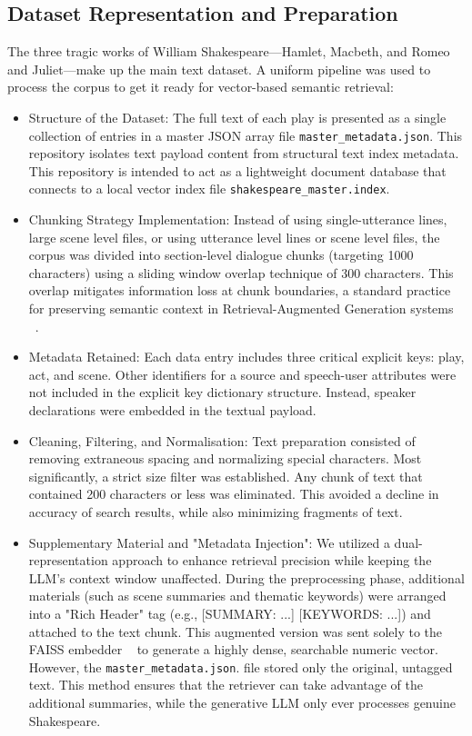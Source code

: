 \documentclass[10pt,conference]{IEEEtran}
\begin{document}
\subsection{Dataset Representation and Preparation }

The three tragic works of William Shakespeare—Hamlet, Macbeth, and Romeo and Juliet—make up the main text dataset. A uniform pipeline was used to process the corpus to get it ready for vector-based semantic retrieval: 

 
\begin{itemize}
    \item Structure of the Dataset: The full text of each play is presented as a 
    single collection of entries in a master JSON array file \verb|master_metadata.json|.
    This repository isolates text payload content from structural text index 
    metadata. This repository is intended to act as a lightweight document database that connects to a local vector index file 
    \verb|shakespeare_master.index|.

    \item Chunking Strategy Implementation: Instead of using single-utterance lines, large scene level files, or using utterance level lines or scene level files, the corpus was divided into section-level dialogue chunks (targeting 1000 characters) using a sliding window overlap technique of 300 characters. This overlap mitigates information loss at chunk boundaries, a standard practice for preserving semantic context in Retrieval-Augmented Generation systems ~\cite{gao2023retrieval}.

    \item Metadata Retained: Each data entry includes three critical explicit keys: play, act, and scene. Other identifiers for a source and speech-user attributes were not included in the explicit key dictionary structure. Instead, speaker declarations were embedded in the textual payload.

    \item Cleaning, Filtering, and Normalisation: Text preparation consisted of removing extraneous spacing and normalizing special characters. Most significantly, a strict size filter was established. Any chunk of text that contained 200 characters or less was eliminated. This avoided a decline in accuracy of search results, while also minimizing fragments of text.

    \item Supplementary Material and "Metadata Injection": We utilized a dual-representation approach to enhance retrieval precision while keeping the LLM's context window unaffected. During the preprocessing phase, additional materials (such as scene summaries and thematic keywords) were arranged into a "Rich Header" tag (e.g., [SUMMARY: ...] [KEYWORDS: ...]) and attached to the text chunk. This augmented version was sent solely to the FAISS embedder ~\cite{douze2025faiss} to generate a highly dense, searchable numeric vector. However, the 
    \verb|master_metadata.json|.
    file stored only the original, untagged text. This method ensures that the retriever can take advantage of the additional summaries, while the generative LLM only ever processes genuine Shakespeare.
\end{itemize}
\end{document}
